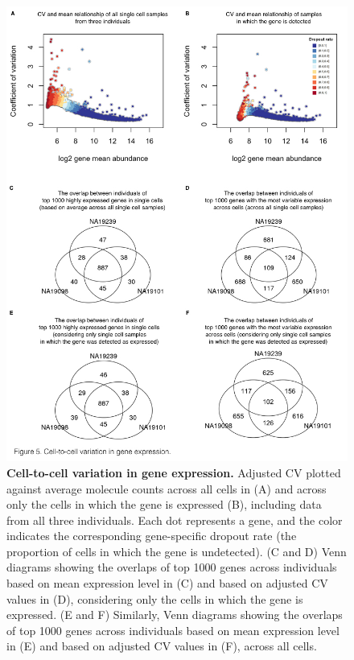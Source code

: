 \begin{figure}
\centering \includegraphics[trim=0 .5in 0
  0,clip,width=5in]{img/ch04/Figure05.jpeg}
\caption[Cell-to-cell variation in gene
  expression.]{\textbf{Cell-to-cell variation in gene expression.}
  Adjusted CV plotted against average molecule counts across all cells
  in (A) and across only the cells in which the gene is expressed (B),
  including data from all three individuals. Each dot represents a
  gene, and the color indicates the corresponding gene-specific
  dropout rate (the proportion of cells in which the gene is
  undetected). (C and D) Venn diagrams showing the overlaps of top
  1000 genes across individuals based on mean expression level in (C)
  and based on adjusted CV values in (D), considering only the cells
  in which the gene is expressed. (E and F) Similarly, Venn diagrams
  showing the overlaps of top 1000 genes across individuals based on
  mean expression level in (E) and based on adjusted CV values in (F),
  across all cells.}
\label{fig:variation}
\end{figure}

